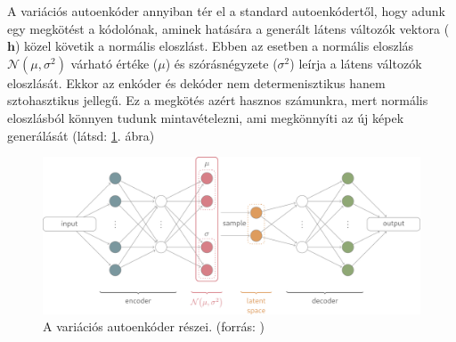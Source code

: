 

A variációs autoenkóder annyiban tér el a standard autoenkódertől, hogy adunk egy megkötést a kódolónak, aminek hatására a generált látens változók vektora ($\textbf{h}$) közel követik a normális eloszlást. Ebben az esetben a normális eloszlás $\mathcal{N}(\mu,\sigma^2)$ várható értéke ($\mu$) és szórásnégyzete ($\sigma^2$) leírja a látens változók eloszlását. Ekkor az enkóder és dekóder nem determenisztikus hanem sztohasztikus jellegű. Ez a megkötés azért hasznos számunkra, mert normális eloszlásból könnyen tudunk mintavételezni, ami megkönnyíti az új képek generálását (látsd: \ref{fig:vae}. ábra)

\begin{figure}[ht]
	\centering
	\includegraphics[width=1\columnwidth]{figures/vae.png}
	\caption{A variációs autoenkóder részei. (forrás: \cite{fig:autoenc_struct})}
	\label{fig:vae}
\end{figure}



